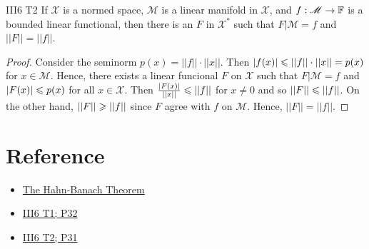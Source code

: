\begin{exercise}{III6 T2}{}
    If $\mathscr{X}$ is a normed space, $\mathscr{M}$ is a linear manifold in $\mathscr{X}$, 
    and $f:\mathscr{M}\rightarrow \mathbb{F}$ is a bounded linear functional, then there is an $F$ in $\mathscr{X}^*$
    such that $F|\mathscr{M}=f$ and $||F||=||f||$.
\end{exercise}
\begin{proof}
    Consider the seminorm $p(x)=||f||\cdot ||x||$. 
    Then $|f(x)|\leqslant ||f||\cdot ||x||=p(x)$ for $x\in\mathscr{M}$.
    Hence, there exists a linear funcional $F$ on $\mathscr{X}$ such that 
    $F|\mathscr{M}=f$ and $|F(x)|\leqslant p(x)$ for all $x\in\mathscr{X}$.
    Then $\frac{|F(x)|}{||x||}\leqslant ||f||$ for $x\neq 0$ and so $||F||\leqslant ||f||$.
    On the other hand, $||F||\geqslant ||f||$ since $F$ agree with $f$ on $\mathscr{M}$.
    Hence, $||F||=||f||$.
\end{proof}

\section{Reference}

\begin{itemize}
    \item \href{https://people.clas.ufl.edu/pascoej/files/6617notes25april2018.pdf}{The Hahn-Banach Theorem}
    \item \href{https://www.math.kit.edu/iana1/lehre/funcana2012w/media/fa-lecturenotes.pdf}{III6 T1; P32}
    \item \href{https://people.clas.ufl.edu/pascoej/files/6617notes25april2018.pdf}{III6 T2; P31}
\end{itemize}